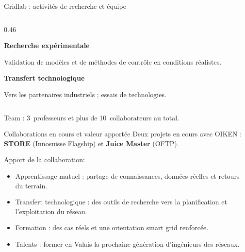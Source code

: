 \documentclass[aspectratio=169,10pt]{beamer}
\begin{document}
\begin{frame}{Gridlab : activités de recherche et équipe}
\begin{columns}[c,onlytextwidth]
\begin{column}{0.46\textwidth}
      \vspace{1.2em}
      {\bfseries\color{primary}Recherche expérimentale\par}
      Validation de modèles et de méthodes de contrôle en conditions
      réalistes.

      \vspace{1.2em}
      {\bfseries\color{primary}Transfert technologique\par}
      Vers les partenaires industriels ; essais de technologies.
    \end{column}
  \end{columns}

  \vfill

  \alert{Team} : 3~professeurs et plus de 10~collaborateurs au total.
\end{frame}

\begin{frame}{Collaborations en cours et valeur apportée}
  Deux projets en cours avec OIKEN : \textbf{STORE} (Innosuisse Flagship) et \textbf{Juice Master} (OFTP).

  \vspace{1.2em}
  \alert{Apport de la collaboration}:
  \vspace{0.3em}
  \begin{itemize}
    \setlength{\itemsep}{0.7em}
    \item Apprentissage mutuel : partage de connaissances, données réelles et retours du terrain.
    \item Transfert technologique : des outils de recherche vers la planification et l’exploitation du réseau.
    \item Formation : des cas réels et une orientation smart grid renforcée.
    \item Talents : former en Valais la prochaine génération d’ingénieurs des réseaux.
  \end{itemize}
\end{frame}

\end{document}
